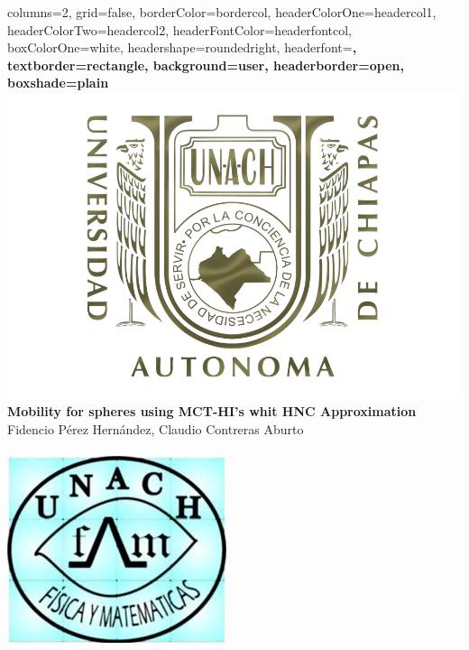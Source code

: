 \documentclass[a0paper,portrait]{baposter}
\begin{document}
\begin{poster}{
columns=2,
grid=false,
borderColor=bordercol, %
headerColorOne=headercol1, %
headerColorTwo=headercol2, %
headerFontColor=headerfontcol, %
boxColorOne=white, %
headershape=roundedright, %
headerfont=\Large\sf\bf, %
textborder=rectangle,
background=user,
headerborder=open, %
boxshade=plain
}
{\includegraphics[scale=0.18]{unach.png}}
%
%
{ \bf  \LARGE {Mobility for spheres using
MCT-HI's whit HNC Approximation
} }
{\vspace{0.3em} \small\sf Fidencio P\'erez Hern\'andez, Claudio Contreras Aburto\\  %
\vspace{0.3em}
\small{}\\
\vspace{0.3em}
\small{}} %
{\includegraphics[scale=0.28]{LogoFCFM.jpg}} %


\end{poster}
\end{document}
